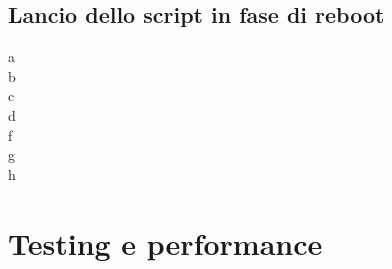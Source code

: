 \documentclass[12pt]{article}
\begin{document}
\subsection{Lancio dello script in fase di reboot}
a\\
b\\
c\\
d\\
f\\
g\\
h\\

\newpage



\section{Testing e performance}
\end{document}
